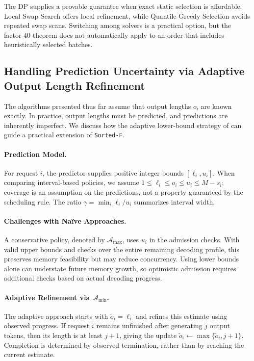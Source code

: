 \documentclass[nonblindrev]{informs3_hide}
\newcommand{\sortF}{\texttt{Sorted-F}}
\begin{document}
The DP supplies a provable guarantee when exact static selection is affordable. Local Swap Search offers local refinement, while Quantile Greedy Selection avoids repeated swap scans. Switching among solvers is a practical option, but the factor-$40$ theorem does not automatically apply to an order that includes heuristically selected batches.

\subsection{Handling Prediction Uncertainty via Adaptive Output Length Refinement} \label{subsec:prediction}

The algorithms presented thus far assume that output lengths $o_i$ are known exactly. In practice, output lengths must be predicted, and predictions are inherently imperfect. We discuss how the adaptive lower-bound strategy of \cite{chen2025adaptively} can guide a practical extension of \sortF{}.

\paragraph{Prediction Model.}
For request $i$, the predictor supplies positive integer bounds $[\ell_i,u_i]$. When comparing interval-based policies, we assume $1\le\ell_i\le o_i\le u_i\le M-s_i$; coverage is an assumption on the predictions, not a property guaranteed by the scheduling rule. The ratio $\gamma=\min_i\ell_i/u_i$ summarizes interval width.

\paragraph{Challenges with Na\"ive Approaches.}
A conservative policy, denoted by $\mathcal A_{\max}$, uses $u_i$ in the admission checks. With valid upper bounds and checks over the entire remaining decoding profile, this preserves memory feasibility but may reduce concurrency. Using lower bounds alone can understate future memory growth, so optimistic admission requires additional checks based on actual decoding progress.

\paragraph{Adaptive Refinement via $\mathcal A_{\min}$.}
The adaptive approach starts with $\tilde o_i=\ell_i$ and refines this estimate using observed progress. If request $i$ remains unfinished after generating $j$ output tokens, then its length is at least $j+1$, giving the update $\tilde o_i\leftarrow\max\{\tilde o_i,j+1\}$. Completion is determined by observed termination, rather than by reaching the current estimate.
\end{document}
